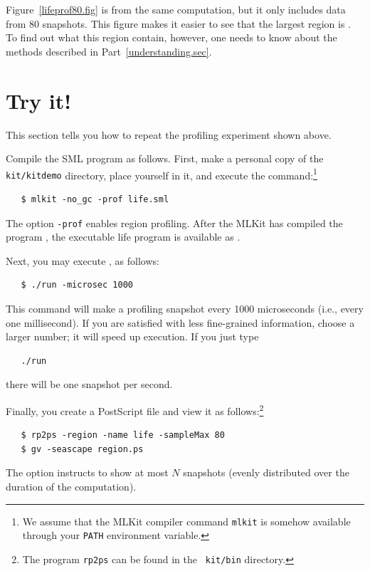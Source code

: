 \documentclass[12pt]{book}
\begin{document}
Figure~\ref{lifeprof80.fig} is from the same computation, but it only
includes data from 80 snapshots. This figure makes it easier to see
that the largest region is . To find out what this
region contain, however, one needs to know about the methods described
in Part~\ref{understanding.sec}.

\section{Try it!}
This section tells you how to repeat the profiling experiment shown
above.

Compile the SML program  as follows. First,
make a personal copy of the {\tt kit/kitdemo} directory, place
yourself in it, and execute the command:\footnote{We assume that the
  MLKit compiler command \texttt{mlkit} is somehow available through
  your {\tt PATH} environment variable.}
\begin{verbatim}
   $ mlkit -no_gc -prof life.sml
\end{verbatim}
The option \texttt{-prof} enables region profiling. After the MLKit
has compiled the program , the executable life
program is available as .

Next, you may execute , as follows:
\begin{verbatim}
   $ ./run -microsec 1000
\end{verbatim}
This command will make a profiling snapshot every 1000 microseconds (i.e.,
every one millisecond). If you are satisfied with less fine-grained
information, choose a larger number; it will speed up execution. If
you just type
\begin{verbatim}
   ./run 
\end{verbatim}
there will be one snapshot per second.

Finally, you create a PostScript file and view it as
follows:\footnote{The program {\tt rp2ps} can be found in the {\tt
    kit/bin} directory.}
%
\begin{verbatim}
   $ rp2ps -region -name life -sampleMax 80 
   $ gv -seascape region.ps
\end{verbatim}
The option  instructs  to show at
most $N$ snapshots (evenly distributed over the duration of the
computation).
\end{document}
